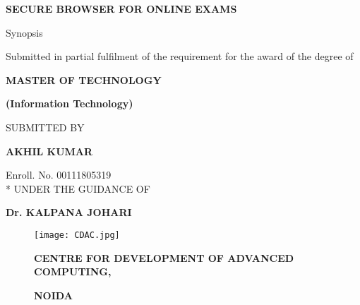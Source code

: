 \documentclass{article}
\begin{document}
\begin{center}
{\fontsize{24}{29}\selectfont \textbf{SECURE BROWSER FOR ONLINE EXAMS}}
\end{center}
\bigskip
\begin{center}
{\fontsize{13}{16}\selectfont Synopsis}

\smallskip
{\fontsize{13}{16}\selectfont Submitted in partial fulfilment of the requirement for the award of the degree of}

\end{center}
\bigskip
\smallskip
\begin{center}
{\fontsize{12}{13}\selectfont \textbf{MASTER OF TECHNOLOGY} }
\end{center}
\begin{center}
{\fontsize{12}{13}\selectfont \textbf{(Information Technology)} }
\end{center}
\bigskip

\begin{center}

{\fontsize{13}{16}\selectfont SUBMITTED BY} 
\end{center}

\begin{center}
{\fontsize{12}{13}\selectfont \textbf{AKHIL KUMAR} }
\linebreak[3]

{\fontsize{13}{16}\selectfont Enroll. No. 00111805319}
\\*
\bigskip
{\fontsize{13}{16}\selectfont UNDER THE GUIDANCE OF }
\end{center}

\begin{center}
{\fontsize{12}{13}\selectfont \textbf{Dr. KALPANA JOHARI} }
\end{center}

\begin{figure}[htbp] 
\begin{center}
\texttt{[image: CDAC.jpg]}
\label{fig:banana}
\end{center}
\begin{center}
{\fontsize{12}{13}\selectfont \textbf{ CENTRE FOR DEVELOPMENT OF ADVANCED COMPUTING, } }
\end{center}
\begin{center}
{\fontsize{12}{13}\selectfont \textbf{ NOIDA} }
\end{center}
\end{figure}
\end{document}
